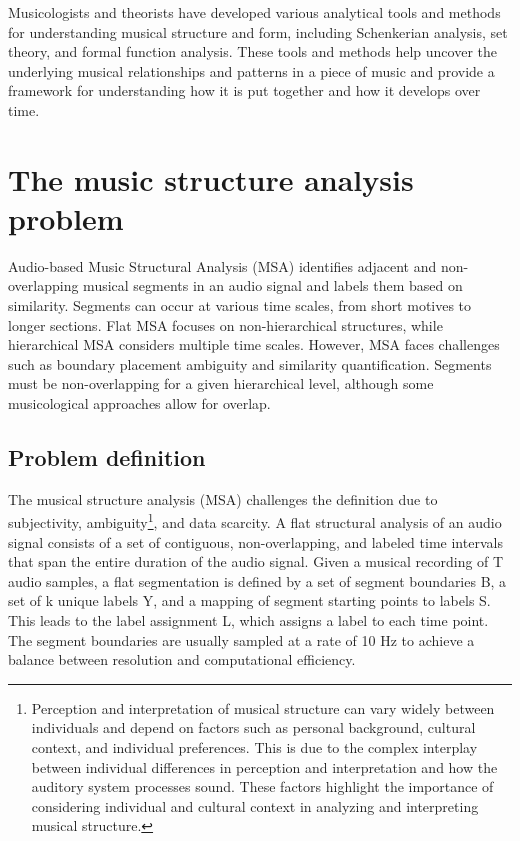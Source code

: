 Musicologists and theorists have developed various analytical tools and methods for understanding musical structure and form, including Schenkerian analysis, set theory, and formal function analysis. These tools and methods help uncover the underlying musical relationships and patterns in a piece of music and provide a framework for understanding how it is put together and how it develops over time.

\section{The music structure analysis problem}

Audio-based Music Structural Analysis (MSA) identifies adjacent and non-overlapping musical segments in an audio signal and labels them based on similarity. Segments can occur at various time scales, from short motives to longer sections. Flat MSA focuses on non-hierarchical structures, while hierarchical MSA considers multiple time scales. However, MSA faces challenges such as boundary placement ambiguity and similarity quantification. Segments must be non-overlapping for a given hierarchical level, although some musicological approaches allow for overlap.

\subsection{Problem definition}

The musical structure analysis (MSA) challenges the definition due to subjectivity, ambiguity\footnote{Perception and interpretation of musical structure can vary widely between individuals and depend on factors such as personal background, cultural context, and individual preferences. This is due to the complex interplay between individual differences in perception and interpretation and how the auditory system processes sound. These factors highlight the importance of considering individual and cultural context in analyzing and interpreting musical structure.}, and data scarcity. A flat structural analysis of an audio signal consists of a set of contiguous, non-overlapping, and labeled time intervals that span the entire duration of the audio signal. Given a musical recording of T audio samples, a flat segmentation is defined by a set of segment boundaries B, a set of k unique labels Y, and a mapping of segment starting points to labels S. This leads to the label assignment L, which assigns a label to each time point. The segment boundaries are usually sampled at a rate of 10 Hz to achieve a balance between resolution and computational efficiency.

